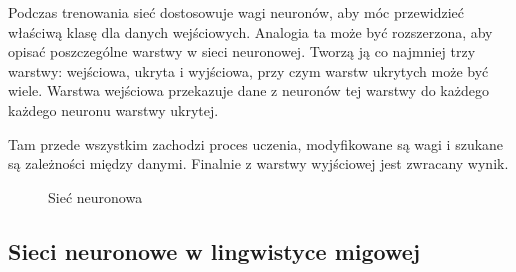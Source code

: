 Podczas trenowania sieć dostosowuje wagi neuronów, aby móc przewidzieć właściwą klasę dla danych wejściowych. Analogia ta może być rozszerzona, aby opisać poszczególne warstwy w sieci neuronowej. Tworzą ją co najmniej trzy warstwy: wejściowa, ukryta i wyjściowa, przy czym warstw ukrytych może być wiele. Warstwa wejściowa przekazuje dane z neuronów tej warstwy do każdego każdego neuronu warstwy ukrytej.

Tam przede wszystkim zachodzi proces uczenia, modyfikowane są wagi i szukane są zależności między danymi. Finalnie z warstwy wyjściowej jest zwracany wynik.

\begin{figure}[H]
    \centering
    \caption{Sieć neuronowa}
    \label{fig:artificial-neural-network}
\end{figure}

\subsection{Sieci neuronowe w lingwistyce migowej}
\label{subsec:neural-networks-layers-architecture}

